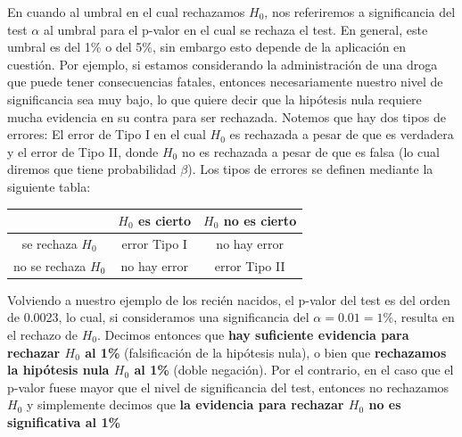 En cuando al umbral en el cual rechazamos $H_0$, nos referiremos a significancia del test $\alpha$ al umbral para el p-valor en el cual se rechaza el test. En general, este umbral es del 1\% o del 5\%, sin embargo esto depende de la aplicación en cuestión. Por ejemplo, si estamos considerando la administración de una droga que puede tener consecuencias fatales, entonces necesariamente nuestro nivel de significancia sea muy bajo, lo que quiere decir que la hipótesis nula requiere mucha evidencia en su contra para ser rechazada. Notemos que hay dos tipos de errores: El error de Tipo I en el cual $H_0$ es rechazada a pesar de que es verdadera y el error de Tipo II, donde $H_0$ no es rechazada a pesar de que es falsa (lo cual diremos que tiene probabilidad $\beta$). Los tipos de errores se definen mediante la siguiente tabla:

\vspace{1em}
\begin{center}
	\begin{tabular}{c|cc}
			  & $H_0$ es cierto & $H_0$ no es cierto  \\
			\hline
			se rechaza $H_0$  & error Tipo I  & no hay error    \\
			no se rechaza $H_0$  & no hay error   & error Tipo II
	\end{tabular}
\end{center}

Volviendo a nuestro ejemplo de los recién nacidos, el p-valor del test es del orden de 0.0023, lo cual, si consideramos una significancia del $\alpha=0.01=1\%$, resulta en el rechazo de $H_0$. Decimos entonces que \textbf{ hay suficiente evidencia para rechazar $H_0$ al 1\%}  (falsificación de la hipótesis nula), o bien que \textbf{ rechazamos la hipótesis nula $H_0$ al 1\%} (doble negación). Por el contrario, en el caso que el p-valor fuese mayor que el nivel de significancia del test, entonces no rechazamos $H_0$ y simplemente decimos que \textbf{ la evidencia para rechazar $H_0$ no es significativa al 1\%}



